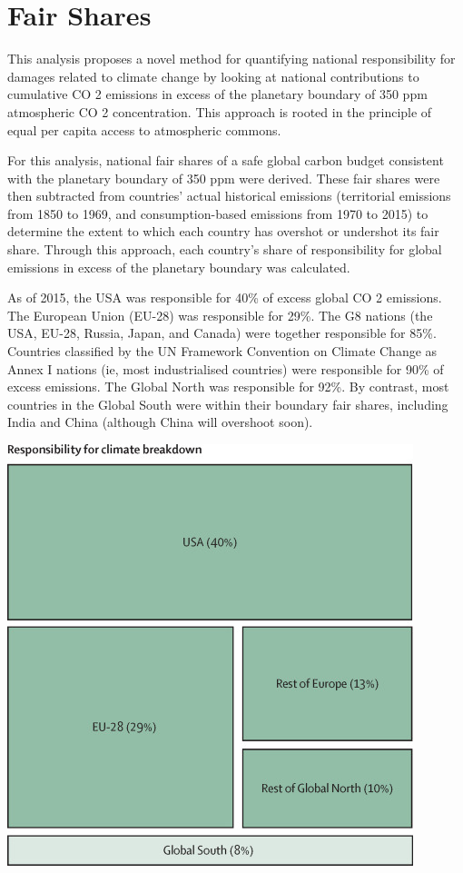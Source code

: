 \documentclass[
]{book}
\begin{document}
\hypertarget{fair-shares}{%
\chapter{Fair Shares}\label{fair-shares}}

This analysis proposes a novel method for quantifying national responsibility for damages related to
climate change by looking at national contributions to cumulative CO 2 emissions in excess of the planetary boundary
of 350 ppm atmospheric CO 2 concentration. This approach is rooted in the principle of equal per capita access to
atmospheric commons.

For this analysis, national fair shares of a safe global carbon budget consistent with the planetary boundary
of 350 ppm were derived. These fair shares were then subtracted from countries' actual historical emissions (territorial
emissions from 1850 to 1969, and consumption-based emissions from 1970 to 2015) to determine the extent to which
each country has overshot or undershot its fair share. Through this approach, each country's share of responsibility
for global emissions in excess of the planetary boundary was calculated.

As of 2015, the USA was responsible for 40\% of excess global CO 2 emissions. The European Union (EU-28)
was responsible for 29\%. The G8 nations (the USA, EU-28, Russia, Japan, and Canada) were together responsible
for 85\%. Countries classified by the UN Framework Convention on Climate Change as Annex I nations (ie, most
industrialised countries) were responsible for 90\% of excess emissions. The Global North was responsible for 92\%.
By contrast, most countries in the Global South were within their boundary fair shares, including India and China
(although China will overshoot soon).

\includegraphics{fig/Hickel_fair_shares.jpg}
\end{document}
